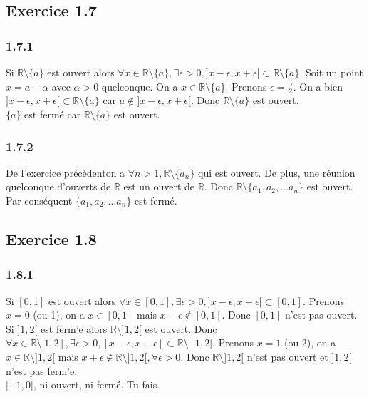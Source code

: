 \documentclass[]{book}
\theoremstyle{definition}
\newcommand{\bb}[1]{\mathbb{#1}}
\newcommand{\R}{\bb{R}}
\begin{document}
\subsection*{Exercice 1.7}
\subsubsection*{1.7.1}
Si $\R \setminus \{a\}$ est ouvert alors $\forall x \in \R \setminus \{a\}, \exists \epsilon > 0, ]x-\epsilon, x+\epsilon[ \subset \R \setminus \{a\}$. Soit un point $x=a+\alpha$ avec $\alpha>0$ quelconque. On a $x \in \R \setminus \{a\}$. Prenons $\epsilon = \frac{\alpha}{2}$. On a bien $]x-\epsilon, x+\epsilon[ \subset \R \setminus \{a\}$ car $a \notin ]x-\epsilon, x+\epsilon[$. Donc $\R \setminus \{a\}$ est ouvert. \\
$\{a\}$ est ferm\'e car $\R \setminus \{a\}$ est ouvert.
\subsubsection*{1.7.2}
De l'exercice pr\'ec\'edenton a $\forall n >1, \R \setminus \{a_n\}$ qui est ouvert. De plus, une r\'eunion quelconque d’ouverts de $\R$ est un ouvert de $\R$. Donc 
$\R \setminus \{a_1, a_2, \ldots a_n\}$ est ouvert. Par cons\'equent $\{a_1, a_2, \ldots a_n\}$ est ferm\'e.

\subsection*{Exercice 1.8}
\subsubsection*{1.8.1}
Si $[0,1]$ est ouvert alors $\forall x \in [0,1], \exists \epsilon > 0, ]x-\epsilon, x+\epsilon[ \subset [0,1]$. Prenons $x = 0$ (ou 1), on a $x \in [0,1]$ mais 
$x-\epsilon \notin [0,1]$. Donc $[0,1]$ n'est pas ouvert.\\

Si $]1,2[$ est ferm'e alors $\R \setminus ]1,2[$ est ouvert. Donc $\forall x \in \R \setminus ]1,2[, \exists \epsilon > 0, ]x-\epsilon, x+\epsilon[ \subset \R \setminus ]1,2[$. Prenons $x = 1$ (ou 2), on a $x \in \R \setminus ]1,2[$ mais $x+\epsilon \notin \R \setminus ]1,2[, \forall \epsilon >0$. Donc $\R \setminus ]1,2[$ n'est pas ouvert et $]1,2[$ n'est pas ferm'e.\\

$[-1,0[$, ni ouvert, ni ferm\'e. Tu fais.
\end{document}
